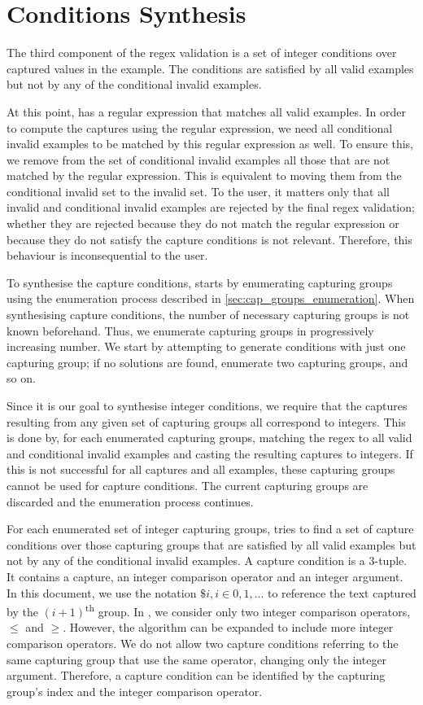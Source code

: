 \section{Conditions Synthesis}\label{sec:cap_cond_synthesis}
The third component of the regex validation is a set of integer conditions over captured values in the example. The conditions are satisfied by all valid examples but not by any of the conditional invalid examples.

At this point, \Forest has a regular expression that matches all valid examples.
In order to compute the captures using the regular expression, we need all conditional invalid examples to be matched by this regular expression as well.
To ensure this, we remove from the set of conditional invalid examples all those that are not matched by the regular expression. 
This is equivalent to moving them from the conditional invalid set to the invalid set.
To the user, it matters only that all invalid and conditional invalid examples are rejected by the final regex validation; whether they are rejected because they do not match the regular expression or because they do not satisfy the capture conditions is not relevant. Therefore, this behaviour is inconsequential to the user.

To synthesise the capture conditions, \Forest starts by enumerating capturing groups using the enumeration process described in \autoref{sec:cap_groups_enumeration}. When synthesising capture conditions, the number of necessary capturing groups is not known beforehand. Thus, we enumerate capturing groups in progressively increasing number. We start by attempting to generate conditions with just one capturing group; if no solutions are found, enumerate two capturing groups, and so on.

Since it is our goal to synthesise integer conditions, we require that the captures resulting from any given set of capturing groups all correspond to integers. This is done by, for each enumerated capturing groups, matching the regex to all valid and conditional invalid examples and casting the resulting captures to integers. If this is not successful for all captures and all examples, these capturing groups cannot be used for capture conditions. The current capturing groups are discarded and the enumeration process continues.


For each enumerated set of integer capturing groups, \Forest tries to find a set of capture conditions over those capturing groups that are satisfied by all valid examples but not by any of the conditional invalid examples.
%
A capture condition is a 3-tuple. It contains a capture, an integer comparison operator and an integer argument. In this document, we use the notation \(\$i, i \in 0, 1, ...\) to reference the text captured by the \((i+1)\)\textsuperscript{th} group. In \Forest, we consider only two integer comparison operators, $\le$ and $\ge$. However, the algorithm can be expanded to include more integer comparison operators. We do not allow two capture conditions referring to the same capturing group that use the same operator, changing only the integer argument. Therefore, a capture condition can be identified by the capturing group's index and the integer comparison operator.

